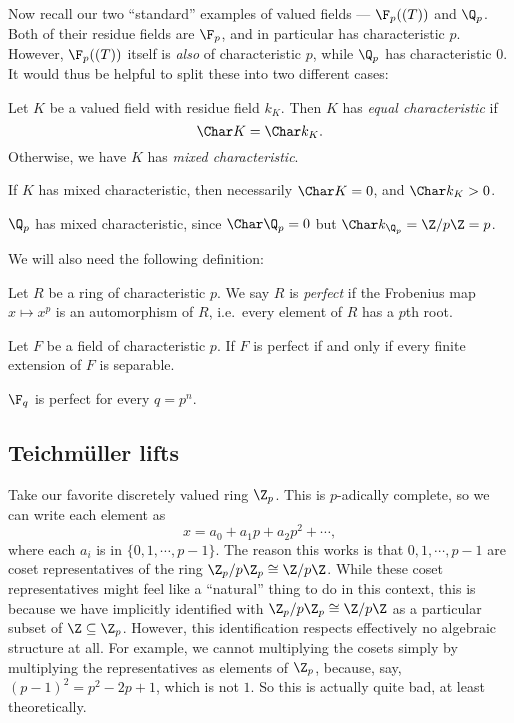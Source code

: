 \documentclass[a4paper]{article}
\begin{document}
Now recall our two ``standard'' examples of valued fields --- $\F_p((T))$ and $\Q_p$. Both of their residue fields are $\F_p$, and in particular has characteristic $p$. However, $\F_p((T))$ itself is \emph{also} of characteristic $p$, while $\Q_p$ has characteristic $0$. It would thus be helpful to split these into two different cases:

\begin{defi}
  Let $K$ be a valued field with residue field $k_K$. Then $K$ has \emph{equal characteristic} if
  \[
    \Char K = \Char k_K.
  \]
  Otherwise, we have $K$ has \emph{mixed characteristic}.
\end{defi}
If $K$ has mixed characteristic, then necessarily $\Char K = 0$, and $\Char k_K > 0$.

\begin{eg}
  $\Q_p$ has mixed characteristic, since $\Char \Q_p = 0$ but $\Char k_{\Q_p} = \Z/p\Z = p$.
\end{eg}

We will also need the following definition:
\begin{defi}
  Let $R$ be a ring of characteristic $p$. We say $R$ is \emph{perfect} if the Frobenius map $x \mapsto x^p$ is an automorphism of $R$, i.e.\ every element of $R$ has a $p$th root.
\end{defi}

\begin{fact}
  Let $F$ be a field of characteristic $p$. If $F$ is perfect if and only if every finite extension of $F$ is separable.
\end{fact}

\begin{eg}
  $\F_q$ is perfect for every $q = p^n$.
\end{eg}

\subsection{\texorpdfstring{Teichm\"uller}{Teichmuller} lifts}
Take our favorite discretely valued ring $\Z_p$. This is $p$-adically complete, so we can write each element as
\[
  x = a_0 + a_1 p + a_2 p^2 + \cdots,
\]
where each $a_i$ is in $\{0, 1, \cdots, p - 1\}$. The reason this works is that $0, 1, \cdots, p - 1$ are coset representatives of the ring $\Z_p/p \Z_p \cong \Z/p\Z$. While these coset representatives might feel like a ``natural'' thing to do in this context, this is because we have implicitly identified with $\Z_p/p\Z_p \cong \Z/p\Z$ as a particular subset of $\Z \subseteq \Z_p$. However, this identification respects effectively no algebraic structure at all. For example, we cannot multiplying the cosets simply by multiplying the representatives as elements of $\Z_p$, because, say, $(p - 1)^2 = p^2 - 2p + 1$, which is not $1$. So this is actually quite bad, at least theoretically.
\end{document}
